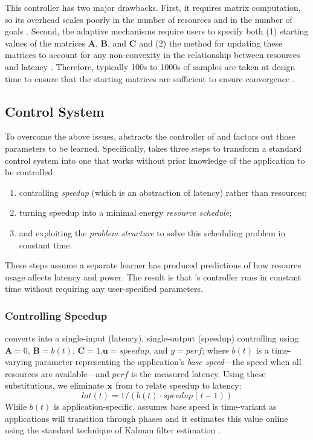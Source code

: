This controller has two major drawbacks.  First, it requires matrix
computation, so its overhead scales poorly in the number of resources
and in the number of goals \cite{Hellerstein2004a,METE}.  Second, the
adaptive mechanisms require users to specify both (1) starting values
of the matrices $\mathbf{A}$, $\mathbf{B}$, and $\mathbf{C}$ and (2)
the method for updating these matrices to account for any
non-convexity in the relationship between resources and latency
\cite{POET,METE,ControlWare,HandbookControl}.  Therefore, typically
100s to 1000s of samples are taken at design time to ensure that the
starting matrices are sufficient to ensure convergence
\cite{FSE2015,sysid,josep-isca2016}.

\subsection{\SYSTEM{} Control System}
To overcome the above issues, \SYSTEM{} abstracts the controller of
 and factors out those parameters to be learned.
Specifically, \SYSTEM{} takes three steps to transform a standard
control system into one that works without prior knowledge of the
application to be controlled:
\begin{enumerate}[leftmargin=1em]
\item controlling \emph{speedup} (which is an abstraction of latency) rather than resources;
\item turning speedup into a minimal energy \emph{resource schedule};
\item and exploiting the \emph{problem structure} to solve this
  scheduling problem in constant time.
\end{enumerate}
These steps assume a separate learner has produced predictions of how
resource usage affects latency and power.  The result is that
\SYSTEM{}'s controller runs in constant time without requiring any
user-specified parameters.



\subsubsection{Controlling Speedup}
\SYSTEM{} converts  into a single-input
(latency), single-output (speedup) controlling using $\mathbf{A} =
0$, $\mathbf{B} = b(t)$, $\mathbf{C} = 1$,$\mathbf{u}= speedup$, and
$y = perf$; where $b(t)$ is a time-varying parameter representing the
application's \emph{base speed}---the speed when all resources are
available---and $perf$ is the measured latency. Using these
substitutions, we eliminate $\mathbf{x}$ from  to relate
speedup to latency:
\begin{equation}
  lat(t) = 1/(b(t) \cdot speedup(t-1)) \label{eqn:speedup}
\end{equation}
While $b(t)$ is application-specific.  \SYSTEM{} assumes base speed is
time-variant as applications will transition through phases and it
estimates this value online using the standard technique of Kalman
filter estimation \cite{welch2006kalman}. 


